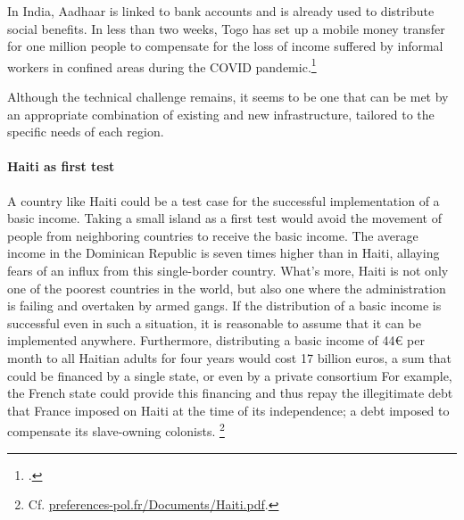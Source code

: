 \documentclass[a5paper,english,openany]{memoir}
\begin{document}
In India, Aadhaar is linked to bank accounts and is %
already used to distribute social benefits. In less than two weeks, Togo has set up a mobile money transfer for one million people to compensate for the loss of income suffered by informal workers in confined areas during the COVID pandemic.\footnote{\citet{ipa_togos_2021}.} 

Although the technical challenge remains, it seems to be one that can be met by an appropriate combination of existing and new infrastructure, tailored to the specific needs of each region. 

\paragraph{Haiti as first test}
A country like Haiti could be a test case for the successful implementation of a basic income. Taking a small island as a first test would avoid the movement of people from neighboring %
countries to receive the basic income. %
The average income in the Dominican Republic is seven times higher than in Haiti, allaying fears of an influx from this single-border %
country. %
What's more, Haiti is not only one of the poorest countries in the world, but also one where the administration is failing and overtaken by armed gangs. If the distribution of a basic income is successful even in such a situation, it is reasonable to assume that it can be implemented anywhere. %
Furthermore, %
distributing a basic income of 44\euro{} per month to all Haitian adults for four years would cost 17 billion euros, a sum that could be financed by a single state, %
or even by a private consortium %
For example, the French state could provide this financing and thus repay the illegitimate debt that France imposed on Haiti at the time of its independence;
a debt imposed to compensate its slave-owning colonists. %
\footnote{Cf. \href{http://preferences-pol.fr/Documents/Haïti.pdf}{preferences-pol.fr/Documents/Haiti.pdf}.}%
\end{document}
